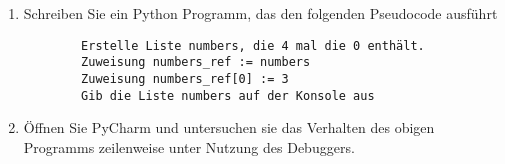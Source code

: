 \begin{enumerate}
	\item Schreiben Sie ein Python Programm, das den folgenden Pseudocode ausführt
	\begin{lstlisting}
		Erstelle Liste numbers, die 4 mal die 0 enthält.
		Zuweisung numbers_ref := numbers
		Zuweisung numbers_ref[0] := 3
		Gib die Liste numbers auf der Konsole aus
	\end{lstlisting}
	\item Öffnen Sie PyCharm und untersuchen sie das Verhalten des obigen Programms zeilenweise unter Nutzung des Debuggers.
\end{enumerate}